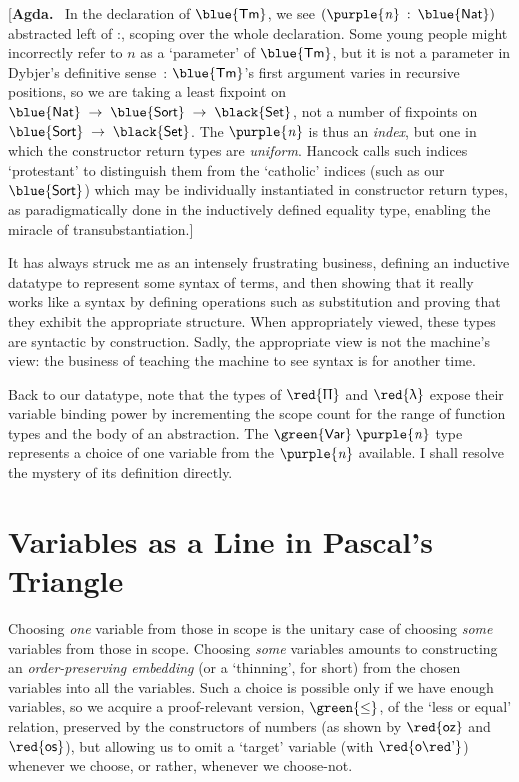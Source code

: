 \documentclass[natbib]{article}
\newcommand{\U}[1]{\black{\mathsf{#1}}}
\newcommand{\D}[1]{\blue{\mathsf{#1}}}
\newcommand{\C}[1]{\red{\mathsf{#1}}}
\newcommand{\F}[1]{\green{\mathsf{#1}}}
\newcommand{\V}[1]{\purple{\mathit{#1}}}
\newcommand{\agdanote}[1]{[\textbf{Agda.}~ #1]}
\begin{document}
\agdanote{In the declaration of \ensuremath{\D{Tm}}, we see \ensuremath{(\V{n}\;\mathbin{:}\;\D{Nat})} abstracted left of \ensuremath{\mathbin{:}},
scoping over the whole declaration. Some young people might incorrectly refer to
$n$ as a `parameter' of \ensuremath{\D{Tm}}, but it is not a parameter in Dybjer's definitive
sense~\cite{dybjer:families}: \ensuremath{\D{Tm}}'s first argument varies in
recursive positions, so we are taking a least fixpoint on \ensuremath{\D{Nat}\;\to \;\D{Sort}\;\to \;\U{Set}},
not a number of fixpoints on \ensuremath{\D{Sort}\;\to \;\U{Set}}. The \ensuremath{\V{n}} is thus an \emph{index},
but one in which the constructor return types are \emph{uniform}. Hancock calls
such indices `protestant' to distinguish them from the `catholic' indices (such
as our \ensuremath{\D{Sort}}) which may be individually instantiated in constructor return
types, as paradigmatically done in the inductively defined equality type,
enabling
the miracle of transubstantiation.}

It has always struck me as an intensely frustrating business, defining
an inductive datatype to represent some syntax of terms, and then
showing that it really works like a syntax by defining operations such
as substitution and proving that they exhibit the appropriate
structure. When appropriately viewed, these types are syntactic by
construction. Sadly, the appropriate view is not the machine's view:
the business of teaching the machine to see syntax is for another time.

Back to our datatype, note that the types of \ensuremath{\C{\Uppi}} and \ensuremath{\C{\uplambda}} expose
their variable binding power by incrementing the scope count for the
range of function types and the body of an abstraction. The \ensuremath{\F{Var}\;\V{n}}
type represents a choice of one variable from the \ensuremath{\V{n}} available. I
shall resolve the mystery of its definition directly.


\section{Variables as a Line in Pascal's Triangle}

Choosing \emph{one} variable from those in scope is the unitary case
of choosing \emph{some} variables from those in scope.  Choosing
\emph{some} variables amounts to constructing an
\emph{order-preserving embedding} (or a `thinning', for short) from
the chosen variables into all the variables.  Such a choice is
possible only if we have enough variables, so we acquire a
proof-relevant version, \ensuremath{\F{\le}}, of the `less or equal' relation,
preserved by the constructors of numbers (as shown by \ensuremath{\C{oz}} and \ensuremath{\C{os}}),
but allowing us to omit a `target' variable (with \ensuremath{\C{o\apo}}) whenever we
choose, or rather, whenever we choose-not.
\end{document}
